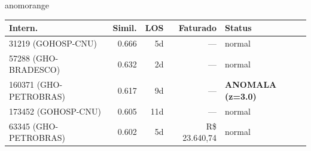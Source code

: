 \documentclass[a4paper,10pt]{article}
\begin{document}
\begin{anomalycard}[Internacao 115153 | GHO-BRADESCO | ALTO (z=4.34)]{anomorange}
\begin{tabular}{l r r r l}\toprule\textbf{Intern.} & \textbf{Simil.} & \textbf{LOS} & \textbf{Faturado} & \textbf{Status} \\\midrule
31219 (GOHOSP-CNU) & 0.666 & 5d & --- & \textcolor{jcubeblue}{normal} \\
57288 (GHO-BRADESCO) & 0.632 & 2d & --- & \textcolor{jcubeblue}{normal} \\
160371 (GHO-PETROBRAS) & 0.617 & 9d & --- & \textcolor{anomred}{\textbf{ANOMALA (z=3.0)}} \\
173452 (GOHOSP-CNU) & 0.605 & 11d & --- & \textcolor{jcubeblue}{normal} \\
63345 (GHO-PETROBRAS) & 0.602 & 5d & R\$ 23.640,74 & \textcolor{jcubeblue}{normal} \\
\bottomrule\end{tabular}



\end{anomalycard}

\newpage
\end{document}
